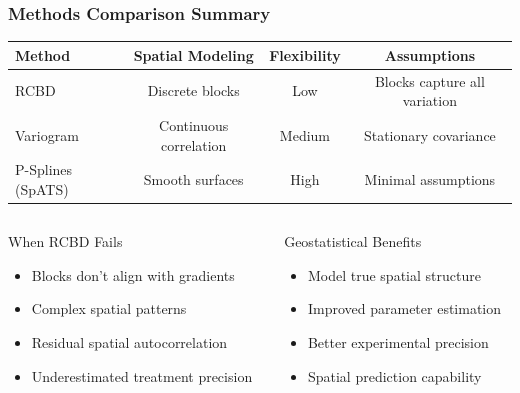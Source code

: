 \begin{frame}
    \frametitle{Methods Comparison Summary}
    
    \begin{table}[h]
        \centering
        \scriptsize
        \begin{tabular}{|l|c|c|c|}
            \hline
            \rowcolor{lightblue}
            \textbf{Method} & \textbf{Spatial Modeling} & \textbf{Flexibility} & \textbf{Assumptions} \\
            \hline
            \rowcolor{lightgray}
            RCBD & Discrete blocks & Low & Blocks capture all variation \\
            \hline
            Variogram & Continuous correlation & Medium & Stationary covariance \\
            \hline
            \rowcolor{lightgray}
            P-Splines (SpATS) & Smooth surfaces & High & Minimal assumptions \\
            \hline
        \end{tabular}
    \end{table}
    
    \vspace{1em}
    
    \begin{columns}[T]
        \begin{column}{0.5\textwidth}
            \begin{block}{When RCBD Fails}
                \begin{itemize}
                    \item Blocks don't align with gradients
                    \item Complex spatial patterns
                    \item Residual spatial autocorrelation
                    \item Underestimated treatment precision
                \end{itemize}
            \end{block}
        \end{column}
        
        \begin{column}{0.5\textwidth}
            \begin{block}{Geostatistical Benefits}
                \begin{itemize}
                    \item Model true spatial structure
                    \item Improved parameter estimation
                    \item Better experimental precision
                    \item Spatial prediction capability
                \end{itemize}
            \end{block}
        \end{column}
    \end{columns}
    

\end{frame}
